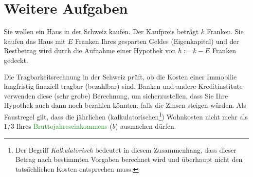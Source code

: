 \clearpage
\section{Weitere Aufgaben}
\begin{myexercise}\label{myexercise:kaufpreis_haus}
	Sie wollen ein Haus in der Schweiz kaufen. Der Kaufpreis beträgt $k$ Franken. Sie kaufen das Haus mit $E$ Franken Ihres gesparten Geldes (Eigenkapital) und der Restbetrag wird durch die Aufnahme einer Hypothek von $h := k - E$ Franken gedeckt.

	Die Tragbarkeitsrechnung in der Schweiz prüft, ob die Kosten einer Immobilie langfristig finaziell tragbar (bezahlbar) sind. Banken und andere Kreditinstitute verwenden diese (sehr grobe) Berechnung, um sicherzustellen, dass Sie Ihre Hypothek auch dann noch bezahlen könnten, falls die Zinsen steigen würden. Als Faustregel gilt, dass die jährlichen (kalkulatorischen\footnote{Der Begriff \textit{Kalkulatorisch} bedeutet in diesem Zusammenhang, dass dieser Betrag nach bestimmten Vorgaben berechnet wird und überhaupt nicht den tatsächlichen Kosten entsprechen muss.}) Wohnkosten nicht mehr als $1 / 3$ Ihres \textcolor{ForestGreen}{Bruttojahreseinkommens} ($b$) ausmachen dürfen.


\end{myexercise}
